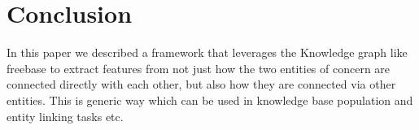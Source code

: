 \documentclass[11pt,a4paper]{article}
\begin{document}
\section{Conclusion}

In this paper we described a framework that leverages the Knowledge graph like
freebase to extract features from not just how the two entities of concern are
connected directly with each other, but also how they are connected via other
entities. This is generic way which can be used in knowledge base population
and entity linking tasks etc.



\end{document}
